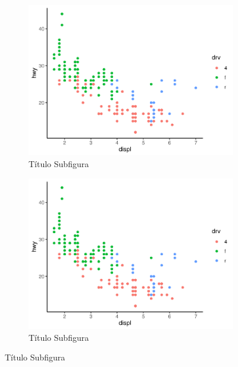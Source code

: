 	\lipsum[1]

	\begin{figure}[h]
		\caption{Exemplo Com Duas Subfiguras}
		\begin{subfigure}[t]{0.5\textwidth}
			\caption{Título Subfigura}
			\includegraphics[width=\linewidth]{fig/plot}
		\end{subfigure}
		\begin{subfigure}[t]{0.5\textwidth}
			\caption{Título Subfigura}
			\includegraphics[width=\linewidth]{fig/plot}
		\end{subfigure}
	\end{figure}

	\lipsum[1-5]
	
